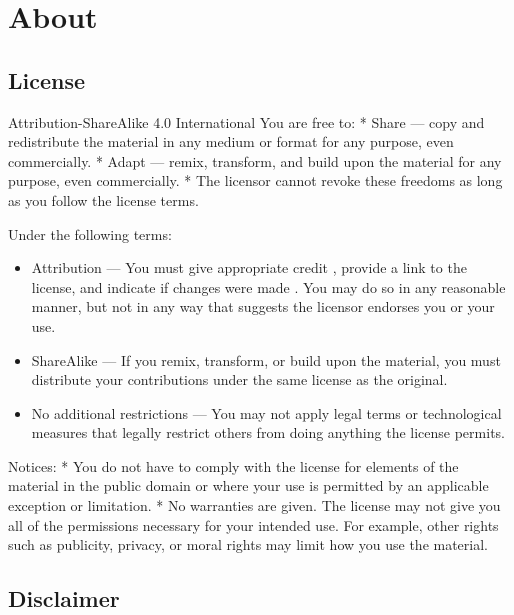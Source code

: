 \documentclass[
  letterpaper,
  DIV=11,
  numbers=noendperiod]{scrreprt}
\providecommand{\tightlist}{%
  \setlength{\itemsep}{0pt}\setlength{\parskip}{0pt}}\usepackage{longtable,booktabs,array}
\begin{document}

\chapter*{About}\label{about}


\section*{License}\label{license}


Attribution-ShareAlike 4.0 International You are free to: * Share ---
copy and redistribute the material in any medium or format for any
purpose, even commercially. * Adapt --- remix, transform, and build upon
the material for any purpose, even commercially. * The licensor cannot
revoke these freedoms as long as you follow the license terms.

Under the following terms:

\begin{itemize}
\tightlist
\item
  Attribution --- You must give appropriate credit , provide a link to
  the license, and indicate if changes were made . You may do so in any
  reasonable manner, but not in any way that suggests the licensor
  endorses you or your use.
\item
  ShareAlike --- If you remix, transform, or build upon the material,
  you must distribute your contributions under the same license as the
  original.
\item
  No additional restrictions --- You may not apply legal terms or
  technological measures that legally restrict others from doing
  anything the license permits.
\end{itemize}

Notices: * You do not have to comply with the license for elements of
the material in the public domain or where your use is permitted by an
applicable exception or limitation. * No warranties are given. The
license may not give you all of the permissions necessary for your
intended use. For example, other rights such as publicity, privacy, or
moral rights may limit how you use the material.

\section*{Disclaimer}\label{disclaimer}
\end{document}
